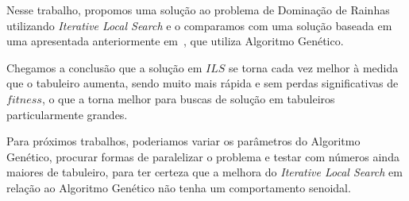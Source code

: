 \documentclass[
	article,			%
	11pt,				%
	oneside,			%
	a4paper,			%
	english,			%
	brazil,				%
	sumario=tradicional
	]{abntex2}
\begin{document}
Nesse trabalho, propomos uma solução ao problema de Dominação de Rainhas utilizando \textit{Iterative Local Search} e o comparamos com uma solução baseada em uma apresentada anteriormente em~\cite{alharbi2017genetic}, que utiliza Algoritmo Genético.

Chegamos a conclusão que a solução em $ILS$ se torna cada vez melhor à medida que o tabuleiro aumenta, sendo muito mais rápida e sem perdas significativas de $fitness$, o que a torna melhor para buscas de solução em tabuleiros particularmente grandes.

Para próximos trabalhos, poderiamos variar os parâmetros do Algoritmo Genético, procurar formas de paralelizar o problema e testar com números ainda maiores de tabuleiro, para ter certeza que a melhora do \textit{Iterative Local Search} em relação ao Algoritmo Genético não tenha um comportamento senoidal.
% 

\postextual

%

\end{document}
